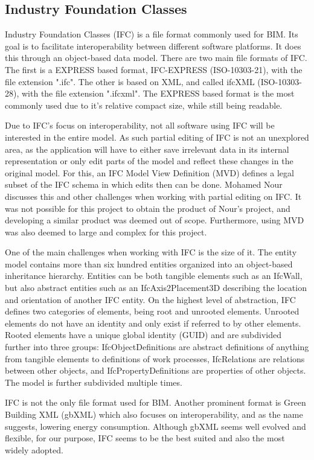\subsection{Industry Foundation Classes}
Industry Foundation Classes (IFC) is a file format commonly used for BIM. Its goal is to facilitate interoperability between different software platforms. It does this through an object-based data model. There are two main file formats of IFC. The first is a EXPRESS based format, IFC-EXPRESS (ISO-10303-21), with the file extension ".ifc". The other is based on XML, and called ifcXML (ISO-10303-28), with the file extension ".ifcxml". The EXPRESS based format is the most commonly used due to it's relative compact size, while still being readable.

Due to IFC's focus on interoperability, not all software using IFC will be interested in the entire model. As such partial editing of IFC is not an unexplored area, as the application will have to either save irrelevant data in its internal representation or only edit parts of the model and reflect these changes in the original model. For this, an IFC Model View Definition (MVD) defines a legal subset of the IFC schema\cite{mvd} in which edits then can be done. Mohamed Nour discusses this and other challenges when working with partial editing on IFC\cite{nour08}. It was not possible for this project to obtain the product of Nour's project, and developing a similar product was deemed out of scope. Furthermore, using MVD was also deemed to large and complex for this project.

One of the main challenges when working with IFC is the size of it. The entity model contains more than six hundred entities organized into an object-based inheritance hierarchy. Entities can be both tangible elements such as an IfcWall, but also abstract entities such as an IfcAxis2Placement3D describing the location and orientation of another IFC entity. On the highest level of abstraction, IFC defines two categories of elements, being root and unrooted elements. Unrooted elements do not have an identity and only exist if referred to by other elements. Rooted elements have a unique global identity (GUID) and are subdivided further into three groups: IfcObjectDefinitions are abstract definitions of anything from tangible elements to definitions of work processes, IfcRelations are relations between other objects, and IfcPropertyDefinitions are properties of other objects. The model is further subdivided multiple times.

IFC is not the only file format used for BIM. Another prominent format is Green Building XML (gbXML) which also focuses on interoperability, and as the name suggests, lowering energy consumption. Although gbXML seems well evolved and flexible, for our purpose, IFC seems to be the best suited and also the most widely adopted.
